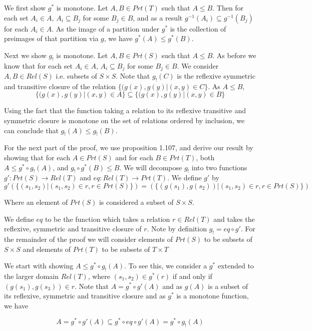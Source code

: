 \solution
We first show $g^{*}$ is monotone.  Let $A, B\in Prt(T)$ such that $A\leq B$.  Then for each set $A_i\in A$, $A_i \subseteq B_j$ for some $B_j\in B$, and as a result $g^{-1}(A_i)\subseteq g^{-1}(B_j)$ for each $A_i\in A$.  As the image of a partition under $g^*$ is the collection of preimages of that partition via $g$, we have $g^{*}(A)\leq g^{*}(B)$.


Next we show $g_!$ is monotone.  Let $A, B\in Prt(S)$ such that $A\leq B$.  As before we know that for each set $A_i\in A$, $A_i\subseteq B_j$ for some $B_j\in B$. We consider $A,B\in Rel(S)$ i.e. subsets of $S\times S$. Note that $g_{!}(C)$  is the reflexive symmetric and transitive closure of the relation $\{ (g(x),g(y)| (x, y)\in C\}$.  As $A\leq B$, 
$$\{ (g(x),g(y)| (x, y)\in A\}\subseteq \{ (g(x),g(y)| (x, y)\in B\}$$

\noindent
  Using the fact that the function taking a relation to its reflexive transitive and symmetric closure is monotone on the set of relations ordered by inclusion, we can conclude that $g_{!}(A)\leq g_{!}(B)$.

\bigskip
For the next part of the proof, we use proposition 1.107, and  derive our result by showing that for each $A\in Prt(S)$ and for each $B\in Prt(T)$, both $A\leq g^*\circ g_!(A)$, and $g_!\circ g^*(B)\leq B$.  We will decompose $g_!$ into two functions $g':Prt(S)\to Rel(T)$ and $eq:Rel(T)\to Prt(T)$. We define $g'$ by 
$$g'(\{(s_1,s_2)|(s_1,s_2)\in r, r\in Prt(S)\}) = (\{(g(s_1),g(s_2))|(s_1,s_2)\in r, r\in Prt(S)\})$$ 

\noindent 
Where an element of $Prt(S)$ is considered a subset of $S\times S$. 

We define $eq$ to be the function which takes a relation $r\in Rel(T)$ and takes the reflexive, symmetric and transitive closure of $r$.  Note by definition $g_! = eq \circ g'$.  For the remainder of the proof we will consider elements of $Prt(S)$ to be subsets of $S\times S$ and elements of $Prt(T)$ to be subsets of $T\times T$

\bigskip
We start with showing $A\leq g^*\circ g_!(A)$.  To see this, we consider a $g^*$ extended to the larger domain $Rel(T)$, where $(s_1,s_2)\in g^*(r)$ if and only if $(g(s_1),g(s_3))\in r$. Note that $A = g^* \circ g'(A)$ and as $g(A)$ is a subset of its reflexive, symmetric and transitive closure and as $g^*$ is a monotone function, we have

 $$A = g^* \circ g'(A)\subseteq  g^* \circ eq\circ g'(A) =  g^*\circ g_!(A)$$

